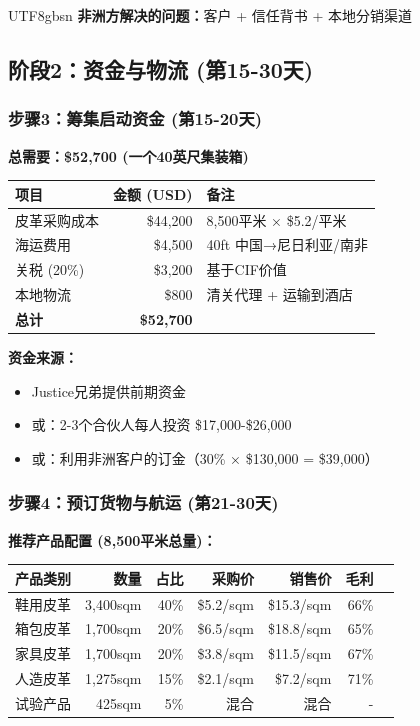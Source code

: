 \documentclass[12pt,a4paper]{article}
\begin{document}
\begin{CJK}{UTF8}{gbsn}
\textbf{非洲方解决的问题：}客户 + 信任背书 + 本地分销渠道

\newpage

\subsection{阶段2：资金与物流 (第15-30天)}

\subsubsection{步骤3：筹集启动资金 (第15-20天)}

\textbf{总需要：\$52,700 (一个40英尺集装箱)}

\begin{center}
\begin{longtable}{lrp{5cm}}
\toprule
\textbf{项目} & \textbf{金额 (USD)} & \textbf{备注} \\
\midrule
皮革采购成本 & \$44,200 & 8,500平米 × \$5.2/平米 \\
海运费用 & \$4,500 & 40ft 中国→尼日利亚/南非 \\
关税 (20\%) & \$3,200 & 基于CIF价值 \\
本地物流 & \$800 & 清关代理 + 运输到酒店 \\
\midrule
\textbf{总计} & \textbf{\$52,700} & \\
\bottomrule
\end{longtable}
\end{center}

\textbf{资金来源：}
\begin{itemize}
    \item Justice兄弟提供前期资金
    \item 或：2-3个合伙人每人投资 \$17,000-\$26,000
    \item 或：利用非洲客户的订金（30\% × \$130,000 = \$39,000）
\end{itemize}

\subsubsection{步骤4：预订货物与航运 (第21-30天)}

\textbf{推荐产品配置 (8,500平米总量)：}

\begin{center}
\begin{longtable}{lrrrrrr}
\toprule
\textbf{产品类别} & \textbf{数量} & \textbf{占比} & \textbf{采购价} & \textbf{销售价} & \textbf{毛利} \\
\midrule
鞋用皮革 & 3,400sqm & 40\% & \$5.2/sqm & \$15.3/sqm & 66\% \\
箱包皮革 & 1,700sqm & 20\% & \$6.5/sqm & \$18.8/sqm & 65\% \\
家具皮革 & 1,700sqm & 20\% & \$3.8/sqm & \$11.5/sqm & 67\% \\
人造皮革 & 1,275sqm & 15\% & \$2.1/sqm & \$7.2/sqm & 71\% \\
试验产品 & 425sqm & 5\% & 混合 & 混合 & - \\
\bottomrule
\end{longtable}
\end{center}


\end{CJK}
\end{document}
